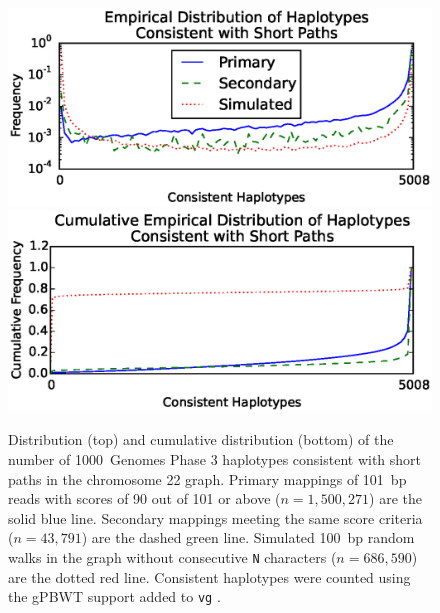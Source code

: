 \begin{figure}[h!]
\centering
\includegraphics[width=\linewidth]{figures/03_gpbwt/histogram.eps}
\includegraphics[width=\linewidth]{figures/03_gpbwt/cumulative.eps}
\caption{Distribution (top) and cumulative distribution (bottom) of the number of 1000~Genomes Phase 3 haplotypes consistent with short paths in the chromosome 22 graph. Primary mappings of 101~bp reads with scores of 90 out of 101 or above ($n=1,500,271$) are the solid blue line. Secondary mappings meeting the same score criteria ($n=43,791$) are the dashed green line. Simulated 100~bp random walks in the graph without consecutive \texttt{N} characters ($n=686,590$) are the dotted red line. Consistent haplotypes were counted using the gPBWT support added to \texttt{vg} \cite{garrison2016vg}.}
\label{fig:consistenthaplotypes}
\end{figure}


